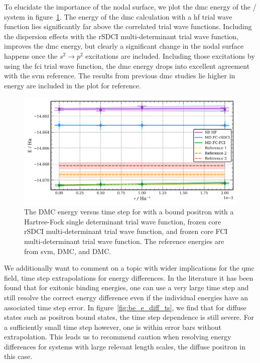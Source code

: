 To elucidate the importance of the nodal surface, we plot the \gls{dmc} energy of the / system in figure~\ref{fig:be_md_extrap}.
The energy of the \gls{dmc} calculation with a \gls{hf} trial wave function lies significantly far above the correlated trial wave functions.
Including the dispersion effects with the \gls{rSDCI} multi-determinant trial wave function, improves the \gls{dmc} energy, but clearly a significant change in the nodal surface happens once the $s^2\rightarrow p^2$ excitations are included.
Including those excitations by using the \gls{fci} trial wave function, the \gls{dmc} energy drops into excellent agreement with the \gls{svm} reference.
The results from previous \gls{dmc} studies lie higher in energy are included in the plot for reference.\cite{10.1021/acs.jctc.1c01193, 10.1063/1.1486447}

\begin{figure}
    \includegraphics[width=\columnwidth,keepaspectratio]{Images/chapter5/be_extrap_multidet.png}
    \caption{\label{fig:be_md_extrap} The DMC energy versus time step for  with a bound positron with a Hartree-Fock single determinant trial wave function, frozen core rSDCI multi-determinant trial wave function, and frozen core FCI multi-determinant trial wave function. The reference energies are from \gls{svm}\cite{10.4208/jams.071510.072110a}, DMC\cite{10.1021/acs.jctc.1c01193}, and DMC\cite{10.1063/1.1486447}.}
\end{figure}

We additionally want to comment on a topic with wider implications for the \gls{qmc} field, time step extrapolations for energy differences.
In the literature it has been found that for exitonic binding energies, one can use a very large time step and still resolve the correct energy difference even if the individual energies have an associated time step error.\cite{10.1103/PhysRevB.98.075122}
In figure~\ref{fig:be_e_diff_ts}, we find that for diffuse states such as positron bound states, the time step dependence is still severe.
For a sufficiently small time step however, one is within error bars without extrapolation.
This leads us to recommend caution when resolving energy differences for systems with large relevant length scales, the diffuse positron in this case.

